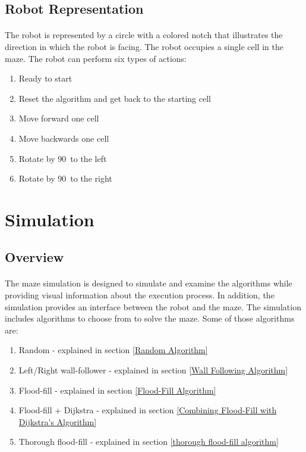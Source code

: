 \documentclass[12pt]{article}
\begin{document}
\subsection{Robot Representation}
\paragraph{}
The robot is represented by a circle with a colored notch that illustrates the direction in which the robot is facing.
The robot occupies a single \gls{cell} in the \gls{maze}.
The robot can perform six types of actions:
\begin{enumerate}
    \item Ready to start
    \item Reset the algorithm and get back to the starting \gls{cell}
    \item Move forward one \gls{cell}
    \item Move backwards one \gls{cell}
    \item Rotate by 90\textdegree\ to the left
    \item Rotate by 90\textdegree\ to the right
\end{enumerate}

\section{Simulation}
\subsection{Overview}
\paragraph{}
The \gls{maze} simulation is designed to simulate and examine the algorithms while providing visual information about the execution process.
In addition, the simulation provides an interface between the robot and the \gls{maze}.
The simulation includes algorithms to choose from to solve the \gls{maze}.
Some of those algorithms are:
\begin{enumerate}
    \item Random - explained in section \ref{Random Algorithm}
    \item Left/Right wall-follower - explained in section \ref{Wall Following Algorithm}
    \item Flood-fill - explained in section \ref{Flood-Fill Algorithm}
    \item Flood-fill + Dijkstra - explained in section \ref{Combining Flood-Fill with Dijkstra's Algorithm}
    \item Thorough flood-fill - explained in section \ref{thorough flood-fill algorithm}
\end{enumerate}
\end{document}
